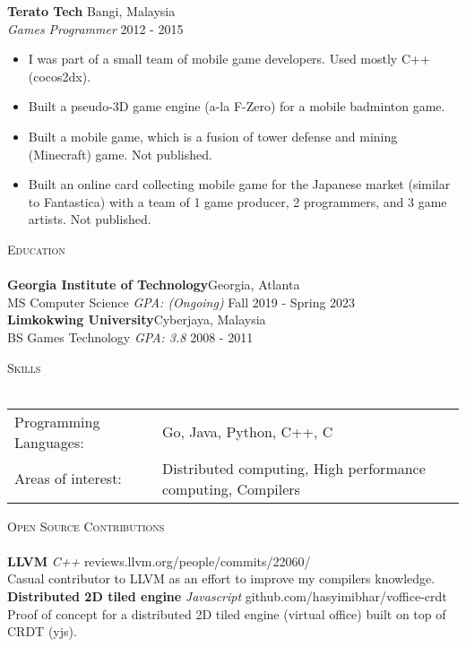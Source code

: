 \documentclass[a4paper]{article}
\newcommand{\lineunder} {
    \vspace*{-8pt} \\
    \hspace*{-18pt} \hrulefill \\
}
\newcommand{\header} [1] {
    {\hspace*{-18pt}\vspace*{6pt} \textsc{#1}}
    \vspace*{-6pt} \lineunder
}
\begin{document}
\textbf{Terato Tech} \hfill Bangi, Malaysia\\
\textit{Games Programmer} \hfill 2012 - 2015\\
\vspace{-1mm}
\begin{itemize} \itemsep 1pt
	\item I was part of a small team of mobile game developers. Used mostly C++ (cocos2dx).
	\item Built a pseudo-3D game engine (a-la F-Zero) for a mobile badminton game.
	\item Built a mobile game, which is a fusion of tower defense and mining (Minecraft) game. Not published.
	\item Built an online card collecting mobile game for the Japanese market (similar to Fantastica) with a team of 1 game producer, 2 programmers, and 3 game artists. Not published.
\end{itemize}

\header{Education}
\textbf{Georgia Institute of Technology}\hfill Georgia, Atlanta\\
MS Computer Science \textit{GPA: (Ongoing)} \hfill Fall 2019 - Spring 2023\\
\vspace{2mm}
\textbf{Limkokwing University}\hfill Cyberjaya, Malaysia\\
BS Games Technology \textit{GPA: 3.8} \hfill 2008 - 2011\\
\vspace{2mm}

\header{Skills}
\begin{tabular}{ l l }
	Programming Languages: & Go, Java, Python, C++, C                                     \\
	Areas of interest:     & Distributed computing, High performance computing, Compilers \\
\end{tabular}
\vspace{2mm}

\header{Open Source Contributions}
{\textbf{LLVM}} {\sl C++} \hfill reviews.llvm.org/people/commits/22060/\\
Casual contributor to LLVM as an effort to improve my compilers knowledge.\\
\vspace*{2mm}
{\textbf{Distributed 2D tiled engine}} {\sl Javascript} \hfill github.com/hasyimibhar/voffice-crdt\\
Proof of concept for a distributed 2D tiled engine (virtual office) built on top of CRDT (yjs).\\
\vspace*{2mm}
\end{document}
